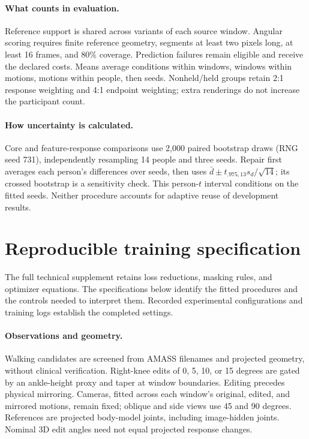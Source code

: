\paragraph{What counts in evaluation.} Reference support is shared across variants of each source window. Angular scoring requires finite reference geometry, segments at least two pixels long, at least 16 frames, and 80\% coverage. Prediction failures remain eligible and receive the declared costs. Means average conditions within windows, windows within motions, motions within people, then seeds. Nonheld/held groups retain 2:1 response weighting and 4:1 endpoint weighting; extra renderings do not increase the participant count.

\paragraph{How uncertainty is calculated.} Core and feature-response comparisons use 2,000 paired bootstrap draws (RNG seed 731), independently resampling 14 people and three seeds. Repair first averages each person's differences over seeds, then uses $\bar d\pm t_{.975,13}s_d/\sqrt{14}$; its crossed bootstrap is a sensitivity check. This person-$t$ interval conditions on the fitted seeds. Neither procedure accounts for adaptive reuse of development results.

\clearpage
\section{Reproducible training specification}
\label{app:methods}
\label{app:optimization}
The full technical supplement retains loss reductions, masking rules, and optimizer equations. The specifications below identify the fitted procedures and the controls needed to interpret them. Recorded experimental configurations and training logs establish the completed settings.

\paragraph{Observations and geometry.} Walking candidates are screened from AMASS filenames and projected geometry, without clinical verification. Right-knee edits of 0, 5, 10, or 15 degrees are gated by an ankle-height proxy and taper at window boundaries. Editing precedes physical mirroring. Cameras, fitted across each window's original, edited, and mirrored motions, remain fixed; oblique and side views use 45 and 90 degrees. References are projected body-model joints, including image-hidden joints. Nominal 3D edit angles need not equal projected response changes.

